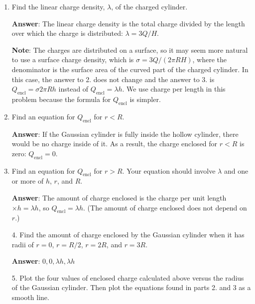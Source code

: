 \documentclass{article}
\begin{document}


\begin{enumerate}

  \item Find the linear charge density, $\lambda$, of the charged cylinder.

        \ifsolutions
          \textbf{Answer}: The linear charge density is the total charge divided by the length over which the charge is distributed: $\lambda={3Q}/{H}$.
        
          \textbf{Note}: The charges are distributed on a surface, so it may seem more natural to use a surface charge density, which is $\sigma = 3Q/(2\pi R H)$, where the denominator is the surface area of the curved part of the charged cylinder. In this case, the answer to 2. does not change and the answer to 3. is $Q_{\text{encl}} = \sigma 2\pi R h$ instead of $Q_{\text{encl}}=\lambda h$. We use charge per length in this problem because the formula for $Q_{\text{encl}}$ is simpler.
        \else
          \vskip 36.135pt
        \fi

  \item Find an equation for $Q_{\text{encl}}$ for $r<R$.

        \ifsolutions
          \textbf{Answer}: If the Gaussian cylinder is fully inside the hollow cylinder, there would be no charge inside of it. As a result, the charge enclosed for $r< R$ is zero: $Q_{\text{encl}}=0$.
        \else
          \vskip 36.135pt
        \fi

  \item Find an equation for $Q_{\text{encl}}$ for $r>R$. Your equation should involve $\lambda$ and one or more of $h$, $r$, and $R$.

        \ifsolutions
          \textbf{Answer}: The amount of charge enclosed is the charge per unit length $\times h = \lambda h$, so  $Q_{\text{encl}}=\lambda h$. (The amount of charge enclosed does not depend on $r$.)
        \else
          \vskip 36.135pt
        \fi

\end{enumerate}

\begin{enumerate}

  \item[4.] Find the amount of charge enclosed by the Gaussian cylinder when it has radii of $r=0$, $r=R/2$, $r=2R$, and $r=3R$.

            \ifsolutions
              \textbf{Answer}: $0, 0, \lambda h, \lambda h$
            \else
              \vskip 36.135pt
            \fi

  \item[5.] Plot the four values of enclosed charge calculated above versus the radius of the Gaussian cylinder. Then plot the equations found in parts 2. and 3 as a smooth line.

            \ifsolutions
              
            \fi

\end{enumerate}
\end{document}
